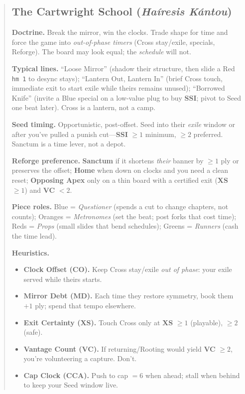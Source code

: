 \documentclass[11pt]{article}
\begin{document}
\begin{quote}
\clearpage
\subsection{The Cartwright School (\textit{Haíresis Kántou})}
\noindent\textbf{Doctrine.} Break the mirror, win the clocks. Trade shape for time and force the game into \emph{out-of-phase timers} (Cross stay/exile, specials, Reforge). The board may look equal; the \emph{schedule} will not.

\medskip
\noindent\textbf{Typical lines.} ``Loose Mirror'' (shadow their structure, then slide a Red \texttt{hm 1} to desync stays); ``Lantern Out, Lantern In'' (brief Cross touch, immediate exit to start exile while theirs remains unused); ``Borrowed Knife'' (invite a Blue special on a low-value plug to buy \textbf{SSI}; pivot to Seed one beat later). Cross is a lantern, not a camp.

\medskip
\noindent\textbf{Seed timing.} Opportunistic, post-offset. Seed into their \emph{exile} window or after you’ve pulled a punish cut---\textbf{SSI} $\ge 1$ minimum, $\ge 2$ preferred. Sanctum is a time lever, not a depot.

\medskip
\noindent\textbf{Reforge preference.} \textbf{Sanctum} if it shortens \emph{their} banner by $\ge 1$ ply or preserves the offset; \textbf{Home} when down on clocks and you need a clean reset; \textbf{Opposing Apex} only on a thin board with a certified exit (\textbf{XS} $\ge 1$) and \textbf{VC} $< 2$.

\medskip
\noindent\textbf{Piece roles.} Blue = \emph{Questioner} (spends a cut to change chapters, not counts); Oranges = \emph{Metronomes} (set the beat; post forks that cost time); Reds = \emph{Props} (small slides that bend schedules); Greens = \emph{Runners} (cash the time lead).

\medskip
\noindent\textbf{Heuristics.}
\begin{itemize}[leftmargin=1.3em,itemsep=0.2em]
  \item \textbf{Clock Offset (CO).} Keep Cross stay/exile \emph{out of phase}: your exile served while theirs starts.
  \item \textbf{Mirror Debt (MD).} Each time they restore symmetry, book them $+1$ ply; spend that tempo elsewhere.
  \item \textbf{Exit Certainty (XS).} Touch Cross only at \textbf{XS} $\ge 1$ (playable), $\ge 2$ (safe).
  \item \textbf{Vantage Count (VC).} If returning/Rooting would yield \textbf{VC} $\ge 2$, you’re volunteering a capture. Don’t.
  \item \textbf{Cap Clock (CCA).} Push to cap $=6$ when ahead; stall when behind to keep your Seed window live.
\end{itemize}


\end{quote}
\end{document}
